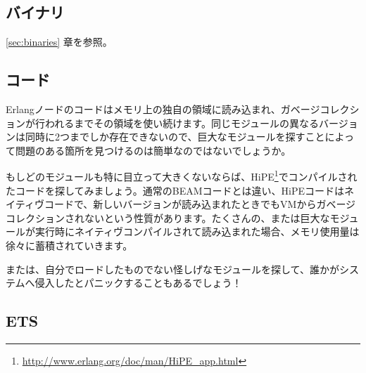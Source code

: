 \subsection{バイナリ}

\ref{sec:binaries} 章を参照。

\subsection{コード}

Erlangノードのコードはメモリ上の独自の領域に読み込まれ、ガベージコレクションが行われるまでその領域を使い続けます。同じモジュールの異なるバージョンは同時に2つまでしか存在できないので、巨大なモジュールを探すことによって問題のある箇所を見つけるのは簡単なのではないでしょうか。

もしどのモジュールも特に目立って大きくないならば、HiPE\footnote{\href{http://www.erlang.org/doc/man/HiPE\_app.html}{http://www.erlang.org/doc/man/HiPE\_app.html}}でコンパイルされたコードを探してみましょう。通常のBEAMコードとは違い、HiPEコードはネイティヴコードで、新しいバージョンが読み込まれたときでもVMからガベージコレクションされないという性質があります。たくさんの、または巨大なモジュールが実行時にネイティヴコンパイルされて読み込まれた場合、メモリ使用量は徐々に蓄積されていきます。

または、自分でロードしたものでない怪しげなモジュールを探して、誰かがシステムへ侵入したとパニックすることもあるでしょう！

\subsection{ETS}

